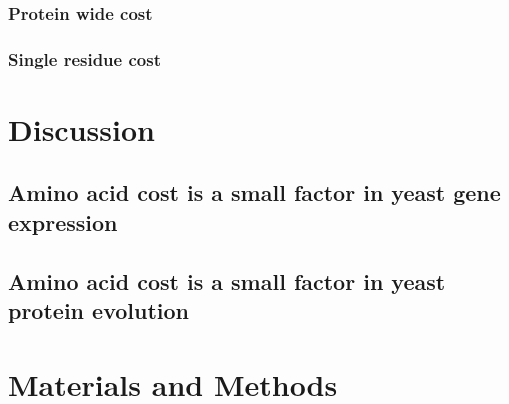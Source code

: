 \subsubsection{Protein wide cost}

\subsubsection{Single residue cost}

\section{Discussion}

\subsection{Amino acid cost is a small factor in yeast gene expression}

\subsection{Amino acid cost is a small factor in yeast protein evolution}

\section{Materials and Methods}
